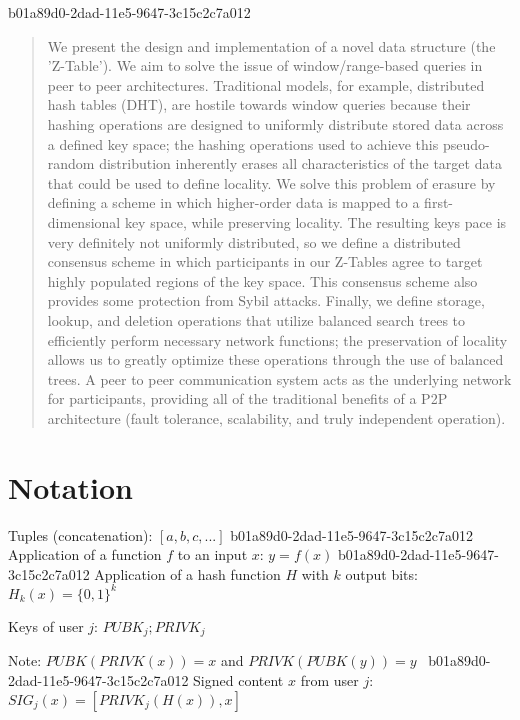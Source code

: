 \documentclass[12pt]{article}
\begin{document}
b01a89d0-2dad-11e5-9647-3c15c2c7a012\maketitle

\begin{abstract}
We present the design and implementation of a novel data structure (the 'Z-Table'). We aim to solve the issue of window/range-based queries in peer to peer architectures. Traditional models, for example,  distributed hash tables (DHT), are hostile towards window queries because their hashing operations are designed to uniformly distribute stored data across a defined key space; the hashing operations used to achieve this pseudo-random distribution inherently erases all characteristics of the target data that could be used to define locality. We solve this problem of erasure by defining a scheme in which higher-order data is mapped to a first-dimensional key space, while preserving locality. The resulting keys pace is very definitely not uniformly distributed, so we define a distributed consensus scheme in which participants in our Z-Tables agree to target highly populated regions of the key space. This consensus scheme also provides some protection from Sybil attacks. Finally, we define storage, lookup, and deletion operations that utilize balanced search trees to efficiently perform necessary network functions; the preservation of locality allows us to greatly optimize these operations through the use of balanced trees. A peer to peer communication system acts as the underlying network for participants, providing all of the traditional benefits of a P2P architecture (fault tolerance, scalability, and truly independent operation).
\end{abstract}

\section{Notation}

Tuples (concatenation): $[a,b,c,...]$
b01a89d0-2dad-11e5-9647-3c15c2c7a012
Application of a function $f$ to an input $x$: $y=f(x)$
b01a89d0-2dad-11e5-9647-3c15c2c7a012
Application of a hash function $H$ with $k$ output bits: $H_{k}(x) = \{0,1\}^k$

Keys of user $j$: $ PUBK_j; PRIVK_j $

Note: $PUBK(PRIVK(x)) = x$ and $PRIVK(PUBK(y)) = y$~
b01a89d0-2dad-11e5-9647-3c15c2c7a012
Signed content $x$ from user $j$: $SIG_j(x) = \left[ PRIVK_j( H(x) ), x \right]$
\end{document}

